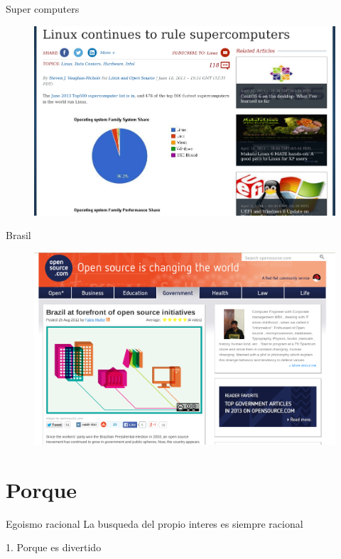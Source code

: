 \documentclass{beamer}
\begin{document}
\begin{frame}{Super computers}
    \pause
    \begin{figure}[tbph]
        \centering
        \includegraphics[width=0.8\linewidth]{Images/top500.png}
    \end{figure}
\end{frame}

\begin{frame}{Brasil}
    \pause
    \begin{figure}[tbph]
        \centering
        \includegraphics[width=0.8\linewidth]{Images/brazil.png}
    \end{figure}
\end{frame}


\section{Porque}

\begin{frame}{Egoismo racional}
La busqueda del propio interes es siempre racional
\end{frame}

\begin{frame}{}
1. Porque es divertido
\end{frame}
\end{document}
